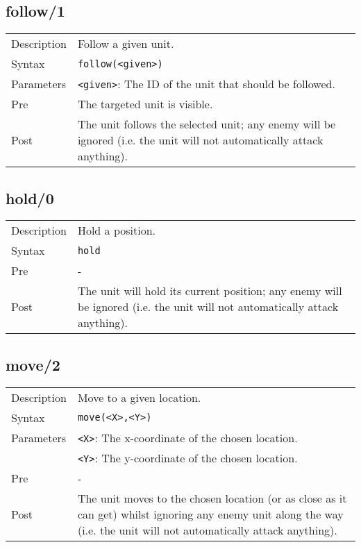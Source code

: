 \subsection{follow/1}
\begin{tabularx}{\textwidth}{lX}
 Description & Follow a given unit. \\
 Syntax & \verb|follow(<given>)| \\
 Parameters & \verb|<given>|: The ID of the unit that should be followed. \\
 Pre & The targeted unit is visible. \\
 Post & The unit follows the selected unit; any enemy will be ignored (i.e. the unit will not automatically attack anything).
\end{tabularx}

\subsection{hold/0}
\begin{tabularx}{\textwidth}{lX}
 Description & Hold a position. \\
 Syntax & \verb|hold| \\
 Pre & - \\
 Post & The unit will hold its current position; any enemy will be ignored (i.e. the unit will not automatically attack anything). 
\end{tabularx}

\subsection{move/2}
\begin{tabularx}{\textwidth}{lX}
 Description & Move to a given location. \\
 Syntax & \verb|move(<X>,<Y>)| \\
 Parameters & \verb|<X>|: The x-coordinate of the chosen location. \\
            &  \verb|<Y>|: The y-coordinate of the chosen location. \\
 Pre & - \\
 Post & The unit moves to the chosen location (or as close as it can get) whilst ignoring any enemy unit along the way (i.e. the unit will not automatically attack anything).
\end{tabularx}

